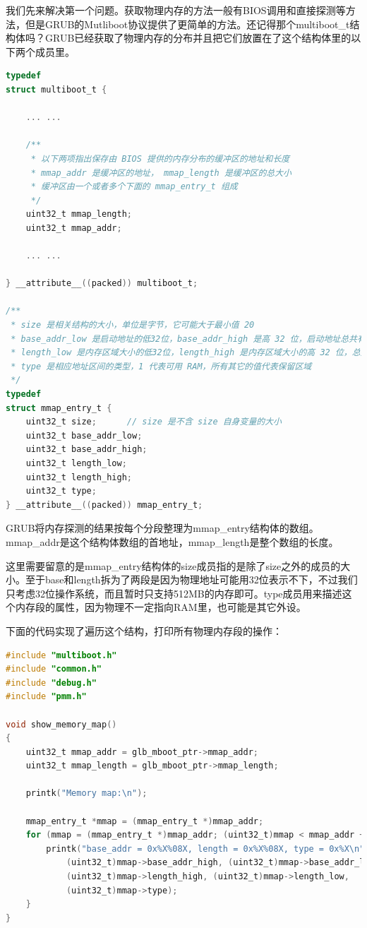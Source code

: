 \par 我们先来解决第一个问题。获取物理内存的方法一般有BIOS调用和直接探测等方法，但是GRUB的Mutliboot协议提供了更简单的方法。还记得那个multiboot\_t结构体吗？GRUB已经获取了物理内存的分布并且把它们放置在了这个结构体里的以下两个成员里。

\begin{lstlisting}[language = C, caption = include/multiboot.h]
typedef
struct multiboot_t {
	
	... ...

	/**
	 * 以下两项指出保存由 BIOS 提供的内存分布的缓冲区的地址和长度
	 * mmap_addr 是缓冲区的地址， mmap_length 是缓冲区的总大小
	 * 缓冲区由一个或者多个下面的 mmap_entry_t 组成
	 */
	uint32_t mmap_length;		
	uint32_t mmap_addr;
	
	... ...

} __attribute__((packed)) multiboot_t;

/**
 * size 是相关结构的大小，单位是字节，它可能大于最小值 20
 * base_addr_low 是启动地址的低32位，base_addr_high 是高 32 位，启动地址总共有 64 位
 * length_low 是内存区域大小的低32位，length_high 是内存区域大小的高 32 位，总共是 64 位
 * type 是相应地址区间的类型，1 代表可用 RAM，所有其它的值代表保留区域
 */
typedef
struct mmap_entry_t {
	uint32_t size; 		// size 是不含 size 自身变量的大小
	uint32_t base_addr_low;
	uint32_t base_addr_high;
	uint32_t length_low;
	uint32_t length_high;
	uint32_t type;
} __attribute__((packed)) mmap_entry_t;
\end{lstlisting}

\par GRUB将内存探测的结果按每个分段整理为mmap\_entry结构体的数组。mmap\_addr是这个结构体数组的首地址，mmap\_length是整个数组的长度。

\par 这里需要留意的是mmap\_entry结构体的size成员指的是除了size之外的成员的大小。至于base和length拆为了两段是因为物理地址可能用32位表示不下，不过我们只考虑32位操作系统，而且暂时只支持512MB的内存即可。type成员用来描述这个内存段的属性，因为物理不一定指向RAM里，也可能是其它外设。

\par 下面的代码实现了遍历这个结构，打印所有物理内存段的操作：

\begin{lstlisting}[language = C, caption = mm/pmm.c]
#include "multiboot.h"
#include "common.h"
#include "debug.h"
#include "pmm.h"

void show_memory_map()
{
	uint32_t mmap_addr = glb_mboot_ptr->mmap_addr;
	uint32_t mmap_length = glb_mboot_ptr->mmap_length;

	printk("Memory map:\n");

	mmap_entry_t *mmap = (mmap_entry_t *)mmap_addr;
	for (mmap = (mmap_entry_t *)mmap_addr; (uint32_t)mmap < mmap_addr + mmap_length; mmap++) {
		printk("base_addr = 0x%X%08X, length = 0x%X%08X, type = 0x%X\n",
			(uint32_t)mmap->base_addr_high, (uint32_t)mmap->base_addr_low,
			(uint32_t)mmap->length_high, (uint32_t)mmap->length_low,
			(uint32_t)mmap->type);
	}
}
\end{lstlisting}

